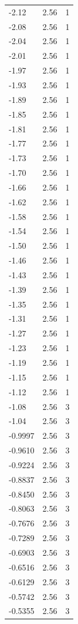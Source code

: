 \begin{longtable}{lrr}
  -2.12 & 2.56 & 1 \\
  -2.08 & 2.56 & 1 \\
  -2.04 & 2.56 & 1 \\
  -2.01 & 2.56 & 1 \\
  -1.97 & 2.56 & 1 \\
  -1.93 & 2.56 & 1 \\
  -1.89 & 2.56 & 1 \\
  -1.85 & 2.56 & 1 \\
  -1.81 & 2.56 & 1 \\
  -1.77 & 2.56 & 1 \\
  -1.73 & 2.56 & 1 \\
  -1.70 & 2.56 & 1 \\
  -1.66 & 2.56 & 1 \\
  -1.62 & 2.56 & 1 \\
  -1.58 & 2.56 & 1 \\
  -1.54 & 2.56 & 1 \\
  -1.50 & 2.56 & 1 \\
  -1.46 & 2.56 & 1 \\
  -1.43 & 2.56 & 1 \\
  -1.39 & 2.56 & 1 \\
  -1.35 & 2.56 & 1 \\
  -1.31 & 2.56 & 1 \\
  -1.27 & 2.56 & 1 \\
  -1.23 & 2.56 & 1 \\
  -1.19 & 2.56 & 1 \\
  -1.15 & 2.56 & 1 \\
  -1.12 & 2.56 & 1 \\
  -1.08 & 2.56 & 3 \\
  -1.04 & 2.56 & 3 \\
  -0.9997 & 2.56 & 3 \\
  -0.9610 & 2.56 & 3 \\
  -0.9224 & 2.56 & 3 \\
  -0.8837 & 2.56 & 3 \\
  -0.8450 & 2.56 & 3 \\
  -0.8063 & 2.56 & 3 \\
  -0.7676 & 2.56 & 3 \\
  -0.7289 & 2.56 & 3 \\
  -0.6903 & 2.56 & 3 \\
  -0.6516 & 2.56 & 3 \\
  -0.6129 & 2.56 & 3 \\
  -0.5742 & 2.56 & 3 \\
  -0.5355 & 2.56 & 3 \\

\end{longtable}
